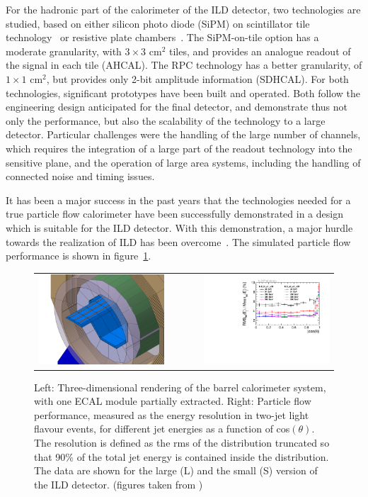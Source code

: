 \documentclass[%
 amsmath,amssymb,
 aps,
 longbibliography,
]{revtex4-1}
\begin{document}
For the hadronic part of the calorimeter of the ILD detector, two technologies are studied, based on either silicon photo diode (SiPM) on scintillator tile technology~\cite{Simon:2010mi} or resistive plate chambers~\cite{Laktineh:2010zsa}. The SiPM-on-tile option has a  moderate granularity, with $3 \times 3$ cm$^2$ tiles, and provides an analogue readout of the signal in each tile (AHCAL). The RPC technology has a better granularity, of $1 \times 1$ cm$^2$, but provides only 2-bit amplitude information (SDHCAL). For both technologies, significant prototypes have been built and operated. Both follow the engineering design anticipated for the final detector, and demonstrate thus not only the performance, but also the scalability of the technology to a large detector. Particular challenges were the handling of the large number of channels, which requires the integration of a large part of the readout technology into the sensitive plane, and the operation of large area systems, including the handling of connected noise and timing issues. 

It has been a major success in the past years that the technologies needed for a true particle flow calorimeter have been successfully demonstrated in a design which is suitable for the ILD detector. With this demonstration, a major hurdle towards the realization of ILD has been overcome~\cite{Sefkow:2018rhp}. The simulated particle flow performance is shown in figure~\ref{fig:pflow}.
\begin{figure}[th]
    \centering
    \begin{tabular}{lcr}
    \includegraphics[width=0.4\hsize]{figures/ECal_insertion.jpg} & ~~~~ &
    \includegraphics[width=0.48\hsize]{figures/CosThetaLargeSmall.pdf}\\
    \end{tabular}
    \caption{Left: Three-dimensional rendering of the barrel calorimeter system, with one ECAL module partially extracted. Right: Particle flow performance, measured as the energy resolution in two-jet light flavour events, for different jet energies as a function of cos$(\theta)$. The resolution is defined as the rms of the distribution truncated so that 90\% of the total jet energy is contained inside the distribution. The data are shown for the large (L) and the small (S) version of the ILD detector. (figures taken from \cite{LCWS2018})}
    \label{fig:pflow}
\end{figure}
\end{document}
